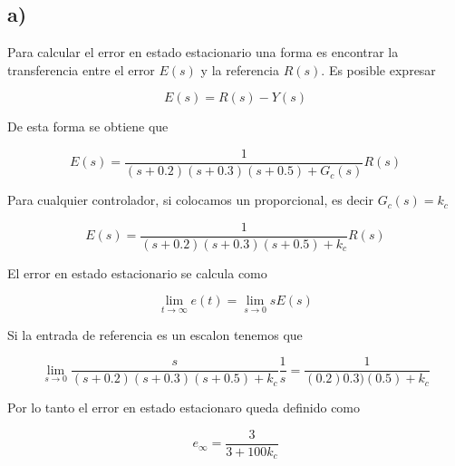 \documentclass{article}
\begin{document}
        \subsection{a)}

        Para calcular el error en estado estacionario una forma es encontrar la transferencia entre el error $E(s)$ y la referencia $R(s)$. Es posible expresar 

        \begin{equation}
            E(s) = R(s) - Y(s)
        \end{equation}

        De esta forma se obtiene que 

        \begin{equation}
            E(s) = \frac{1}{( s + 0.2 )( s + 0.3 )( s + 0.5 ) + G_c(s)} R(s)
        \end{equation}

        Para cualquier controlador, si colocamos un proporcional, es decir $G_c(s)=k_c$

        \begin{equation}
            E(s) = \frac{1}{( s + 0.2 )( s + 0.3 )( s + 0.5 ) + k_c} R(s)
        \end{equation}

        El error en estado estacionario se calcula como 

        \begin{equation}
            \lim_{t \to \infty} e(t) = \lim_{s \to 0} s E(s)
        \end{equation}

        Si la entrada de referencia es un escalon tenemos que 

        \begin{equation}
            \lim_{s \to 0} \frac{s}{( s + 0.2 )( s + 0.3 )( s + 0.5 ) + k_c} \frac{1}{s} = \frac{1}{(0.2)0.3)(0.5) + k_c}
        \end{equation}

        Por lo tanto el error en estado estacionaro queda definido como 

        \begin{equation}
            e_\infty = \frac{3}{3 + 100k_c}
        \end{equation}
\end{document}
